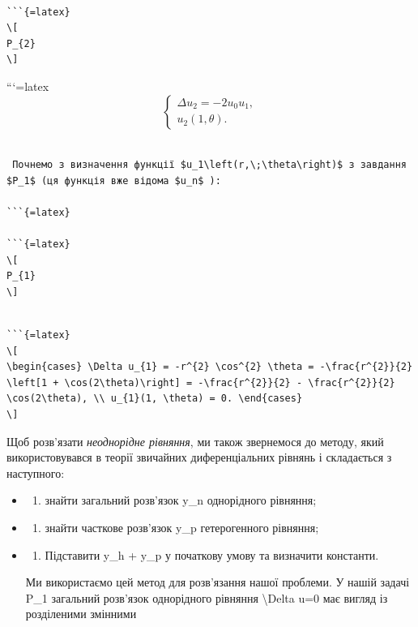 \documentclass[
]{article}
\providecommand{\tightlist}{%
  \setlength{\itemsep}{0pt}\setlength{\parskip}{0pt}}
\begin{document}
\begin{verbatim}

```{=latex}
\[
P_{2}
\]
\end{verbatim}

```{=latex}
\[
\begin{cases} \Delta u_{2} = -2u_{0}u_{1}, \\ u_{2}(1, \theta). \end{cases}
\]

\begin{verbatim}

 Почнемо з визначення функції $u_1\left(r,\;\theta\right)$ з завдання $P_1$ (ця функція вже відома $u_n$ ):

```{=latex}

```{=latex}
\[
P_{1}
\]
\end{verbatim}

\begin{verbatim}

```{=latex}
\[
\begin{cases} \Delta u_{1} = -r^{2} \cos^{2} \theta = -\frac{r^{2}}{2} \left[1 + \cos(2\theta)\right] = -\frac{r^{2}}{2} - \frac{r^{2}}{2} \cos(2\theta), \\ u_{1}(1, \theta) = 0. \end{cases}
\]
\end{verbatim}

Щоб розв'язати \emph{неоднорідне рівняння}, ми також звернемося до
методу, який використовувався в теорії звичайних диференціальних рівнянь
і складається з наступного:

\begin{itemize}
\item
  \begin{enumerate}
  \def\labelenumi{\arabic{enumi})}
  \tightlist
  \item
    знайти загальний розв'язок y\_n однорідного рівняння;
  \end{enumerate}
\item
  \begin{enumerate}
  \def\labelenumi{\arabic{enumi})}
  \setcounter{enumi}{1}
  \tightlist
  \item
    знайти часткове розв'язок y\_p гетерогенного рівняння;
  \end{enumerate}
\item
  \begin{enumerate}
  \def\labelenumi{\arabic{enumi})}
  \setcounter{enumi}{2}
  \tightlist
  \item
    Підставити y\_h + y\_p у початкову умову та визначити константи.
  \end{enumerate}

  Ми використаємо цей метод для розв'язання нашої проблеми. У нашій
  задачі P\_1 загальний розв'язок однорідного рівняння
  \textbackslash Delta u=0 має вигляд із розділеними змінними
\end{itemize}
\end{document}
